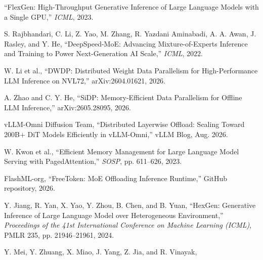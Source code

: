 ``FlexGen: High-Throughput Generative Inference of Large Language Models with a Single GPU,''
\emph{ICML}, 2023.

S. Rajbhandari, C. Li, Z. Yao, M. Zhang, R. Yazdani Aminabadi, A. A. Awan, J. Rasley, and Y. He,
``DeepSpeed-MoE: Advancing Mixture-of-Experts Inference and Training to Power Next-Generation AI Scale,''
\emph{ICML}, 2022.

W. Li et al.,
``DWDP: Distributed Weight Data Parallelism for High-Performance LLM Inference on NVL72,''
arXiv:2604.01621, 2026.

A. Zhao and C. Y. He,
``SiDP: Memory-Efficient Data Parallelism for Offline LLM Inference,''
arXiv:2605.28095, 2026.

vLLM-Omni Diffusion Team,
``Distributed Layerwise Offload: Scaling Toward 200B+ DiT Models Efficiently in vLLM-Omni,''
vLLM Blog, Aug. 2026.

W. Kwon et al.,
``Efficient Memory Management for Large Language Model Serving with PagedAttention,''
\emph{SOSP}, pp. 611--626, 2023.

FlashML-org,
``FreeToken: MoE Offloading Inference Runtime,'' GitHub repository, 2026.


Y. Jiang, R. Yan, X. Yao, Y. Zhou, B. Chen, and B. Yuan,
``HexGen: Generative Inference of Large Language Model over Heterogeneous Environment,''
\emph{Proceedings of the 41st International Conference on Machine Learning (ICML)}, PMLR 235, pp. 21946--21961, 2024.

Y. Mei, Y. Zhuang, X. Miao, J. Yang, Z. Jia, and R. Vinayak,
